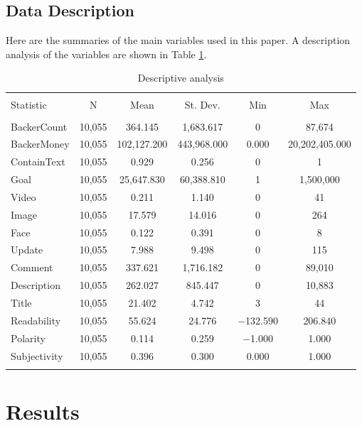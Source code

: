 \documentclass[a4paper]{article}
\begin{document}
\subsection{Data Description}
Here are the summaries of the main variables used in this paper. A description analysis of the variables are shown in Table \ref{tab: Data Description}.
\begin{table}
  \caption{Descriptive analysis} 
  \label{tab: Data Description} 
\begin{tabular}{lccccc}
\\[-1.8ex]\hline 
\hline \\[-1.8ex] 
Statistic & \multicolumn{1}{c}{N} & \multicolumn{1}{c}{Mean} & \multicolumn{1}{c}{St. Dev.} & \multicolumn{1}{c}{Min} & \multicolumn{1}{c}{Max} \\ 
\hline \\[-1.8ex] 
BackerCount & 10,055 & 364.145 & 1,683.617 & 0 & 87,674 \\ 
BackerMoney & 10,055 & 102,127.200 & 443,968.000 & 0.000 & 20,202,405.000 \\ 
ContainText & 10,055 & 0.929 & 0.256 & 0 & 1 \\ 
Goal & 10,055 & 25,647.830 & 60,388.810 & 1 & 1,500,000 \\ 
Video & 10,055 & 0.211 & 1.140 & 0 & 41 \\ 
Image & 10,055 & 17.579 & 14.016 & 0 & 264 \\ 
Face & 10,055 & 0.122 & 0.391 & 0 & 8 \\ 
Update & 10,055 & 7.988 & 9.498 & 0 & 115 \\ 
Comment & 10,055 & 337.621 & 1,716.182 & 0 & 89,010 \\ 
Description & 10,055 & 262.027 & 845.447 & 0 & 10,883 \\ 
Title & 10,055 & 21.402 & 4.742 & 3 & 44 \\ 
Readability & 10,055 & 55.624 & 24.776 & $-$132.590 & 206.840 \\ 
Polarity & 10,055 & 0.114 & 0.259 & $-$1.000 & 1.000 \\ 
Subjectivity & 10,055 & 0.396 & 0.300 & 0.000 & 1.000 \\ 
\hline \\[-1.8ex] 
\end{tabular} 
\end{table} 


\section{Results}
\end{document}
